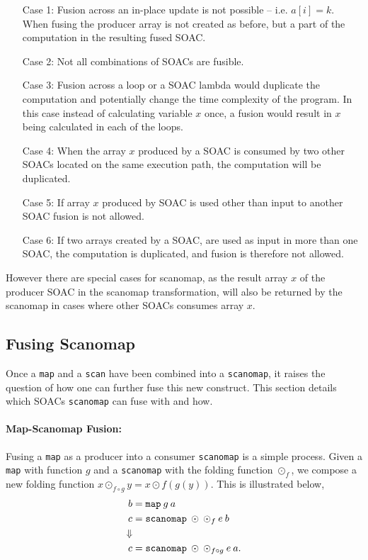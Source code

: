 \documentclass[11pt,bibliography=totocnumbered]{article}
\begin{document}
\begin{itemize}
\item[Case 1:] Fusion across an in-place update is not possible -- i.e. $a[i] = k$. When fusing the producer array is not created as before, but a part of the computation in the resulting fused SOAC.
\item[Case 2:] Not all combinations of SOACs are fusible.
\item[Case 3:] Fusion across a loop or a SOAC lambda would duplicate the computation and potentially change the time complexity of the program. In this case instead of calculating variable $x$ once, a fusion would result in $x$ being calculated in each of the loops. 
\item[Case 4:] When the array $x$ produced by a SOAC is consumed by two other SOACs located on the same execution path, the computation will be duplicated.
\item[Case 5:] If array $x$ produced by SOAC is used other than input to another SOAC fusion is not allowed.
\item[Case 6:] If two arrays created by a SOAC, are used as input in more than one SOAC, the computation is duplicated, and fusion is therefore not allowed.\\ \cite[p. 6]{T2Fusion}
\end{itemize}

However there are special cases for scanomap, as the result array $x$ of the producer SOAC in the scanomap transformation, will also be returned by the scanomap in cases where other SOACs consumes array $x$.


\subsection{Fusing Scanomap}
Once a \texttt{map} and a \texttt{scan} have been combined into a \texttt{scanomap}, it raises the question of how one can further fuse this new construct.
 This section details which SOACs \texttt{scanomap} can fuse with and how.
\paragraph{Map-Scanomap Fusion:}
Fusing a \texttt{map} as a producer into a consumer \texttt{scanomap} is a simple process. Given a \texttt{map} with function $g$ and a 
 \texttt{scanomap} with the folding function $\odot_f$, we compose a new folding function $x \odot_{f \circ g} y = x \odot f (g (y))$. This is illustrated below,
\begin{align*}
  b &= \mathtt{map} \: g \: a \\
  c &= \mathtt{scanomap} \: \odot \: \odot_f \: e \: b \\
\Downarrow \\
  c &= \mathtt{scanomap} \: \odot \: \odot_{f\circ g} \: e \: a\mathnormal{.}
\end{align*}
\end{document}
